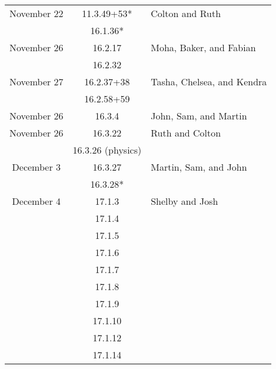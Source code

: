 \documentclass[12pt]{amsart}
\begin{document}
\begin{longtable}{c|c|l}
        November 22     & 11.3.49+53*                          & Colton and Ruth                          \\
                        & 16.1.36*                             &                                          \\
        November 26     & 16.2.17                              & Moha, Baker, and Fabian                  \\
                        & 16.2.32                              &                                          \\
        November 27     & 16.2.37+38                           & Tasha, Chelsea, and Kendra               \\
                        & 16.2.58+59                           &                                          \\
        November 26     & 16.3.4                               & John, Sam, and Martin                    \\
        November 26     & 16.3.22                              & Ruth and Colton                          \\
                        & 16.3.26 (physics)                    &                                          \\
        December 3      & 16.3.27                              & Martin, Sam, and John                    \\
                        & 16.3.28*                             &                                          \\
        December 4      & 17.1.3                               & Shelby and Josh                          \\
                        & 17.1.4                               &                                          \\
                        & 17.1.5                               &                                          \\
                        & 17.1.6                               &                                          \\
                        & 17.1.7                               &                                          \\
                        & 17.1.8                               &                                          \\
                        & 17.1.9                               &                                          \\
                        & 17.1.10                              &                                          \\
                        & 17.1.12                              &                                          \\
                        & 17.1.14                              &                                          
    \end{longtable}
\end{document}
